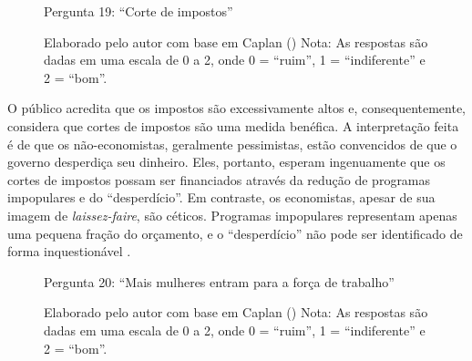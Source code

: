 \begin{figure}[H]
    \centering
    \caption*{Pergunta 19: “Corte de impostos”}
    \caption{Elaborado pelo autor com base em Caplan (\citeyear{The_Myth_of_the_Rational_Voter}) \newline
    Nota: As respostas são dadas em uma escala de 0 a 2, onde 0 = “ruim”, 1 = “indiferente” e 2 = “bom”.}
    \label{fig:pergunta_19}
\end{figure}

O público acredita que os impostos são excessivamente altos e, consequentemente, considera que cortes de impostos são uma medida benéfica. A interpretação feita é de que os não-economistas, geralmente pessimistas, estão convencidos de que o governo desperdiça seu dinheiro. Eles, portanto, esperam ingenuamente que os cortes de impostos possam ser financiados através da redução de programas impopulares e do “desperdício”. Em contraste, os economistas, apesar de sua imagem de \textit{laissez-faire}, são céticos. Programas impopulares representam apenas uma pequena fração do orçamento, e o “desperdício” não pode ser identificado de forma inquestionável \cite{krugman2015accidental,The_Myth_of_the_Rational_Voter}.



\begin{figure}[H]
    \centering
    \caption*{Pergunta 20: “Mais mulheres entram para a força de trabalho”}
    \caption{Elaborado pelo autor com base em Caplan (\citeyear{The_Myth_of_the_Rational_Voter}) \newline
    Nota: As respostas são dadas em uma escala de 0 a 2, onde 0 = “ruim”, 1 = “indiferente” e 2 = “bom”.}
    \label{fig:pergunta_20}
\end{figure}

